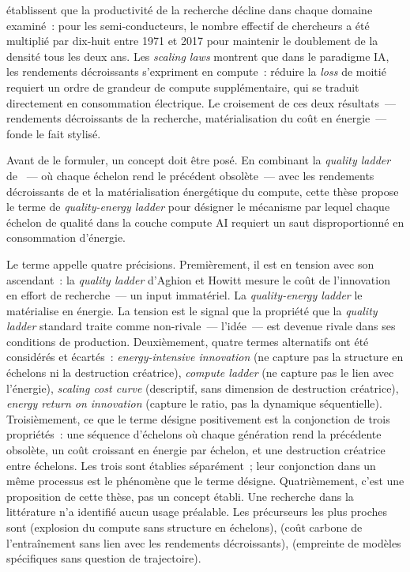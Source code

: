 \textcite{bloom_ideas_2020} établissent que la productivité de la recherche décline dans chaque domaine examiné~: pour les semi-conducteurs, le nombre effectif de chercheurs a été multiplié par dix-huit entre 1971 et 2017 pour maintenir le doublement de la densité tous les deux ans. Les \emph{scaling laws} \parencite{kaplan_scaling_2020,hoffmann_training_2022} montrent que dans le paradigme IA, les rendements décroissants s'expriment en compute~: réduire la \emph{loss} de moitié requiert un ordre de grandeur de compute supplémentaire, qui se traduit directement en consommation électrique. Le croisement de ces deux résultats~--- rendements décroissants de la recherche, matérialisation du coût en énergie~--- fonde le fait stylisé.

Avant de le formuler, un concept doit être posé. En combinant la \emph{quality ladder} de \textcite{aghion_model_1992}~--- où chaque échelon rend le précédent obsolète~--- avec les rendements décroissants de \textcite{bloom_ideas_2020} et la matérialisation énergétique du compute, cette thèse propose le terme de \emph{quality-energy ladder} pour désigner le mécanisme par lequel chaque échelon de qualité dans la couche compute AI requiert un saut disproportionné en consommation d'énergie.

Le terme appelle quatre précisions. Premièrement, il est en tension avec son ascendant~: la \emph{quality ladder} d'Aghion et Howitt mesure le coût de l'innovation en effort de recherche~--- un input immatériel. La \emph{quality-energy ladder} le matérialise en énergie. La tension est le signal que la propriété que la \emph{quality ladder} standard traite comme non-rivale~--- l'idée~--- est devenue rivale dans ses conditions de production. Deuxièmement, quatre termes alternatifs ont été considérés et écartés~: \emph{energy-intensive innovation} (ne capture pas la structure en échelons ni la destruction créatrice), \emph{compute ladder} (ne capture pas le lien avec l'énergie), \emph{scaling cost curve} (descriptif, sans dimension de destruction créatrice), \emph{energy return on innovation} (capture le ratio, pas la dynamique séquentielle). Troisièmement, ce que le terme désigne positivement est la conjonction de trois propriétés~: une séquence d'échelons où chaque génération rend la précédente obsolète, un coût croissant en énergie par échelon, et une destruction créatrice entre échelons. Les trois sont établies séparément~; leur conjonction dans un même processus est le phénomène que le terme désigne. Quatrièmement, c'est une proposition de cette thèse, pas un concept établi. Une recherche dans la littérature n'a identifié aucun usage préalable. Les précurseurs les plus proches sont \textcite{schwartz_green_2020} (explosion du compute sans structure en échelons), \textcite{strubell_energy_2019} (coût carbone de l'entraînement sans lien avec les rendements décroissants), \textcite{patterson_carbon_2021} (empreinte de modèles spécifiques sans question de trajectoire).

